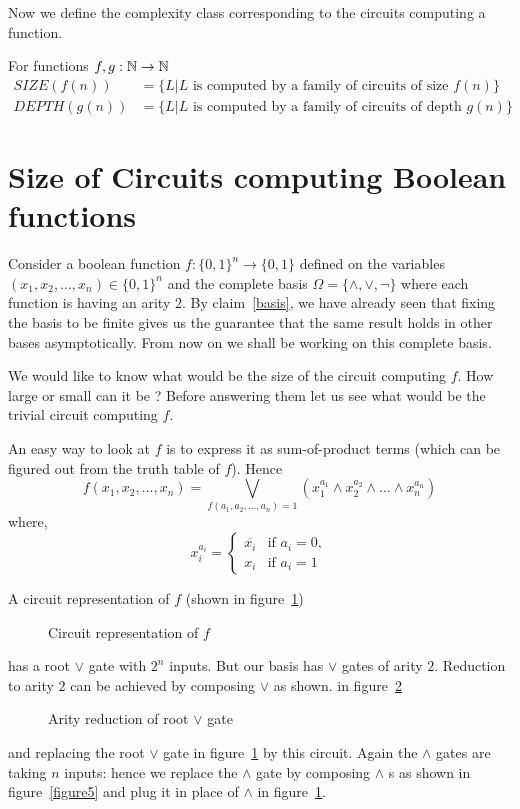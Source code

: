 Now we define the complexity class corresponding to the circuits computing a
function.
\begin{definition} For functions $f,g : {\mathbb{N}} \to {\mathbb{N}}$
\begin{align*}
SIZE(f(n)) & = \{ L | L \text{ is computed by a family of circuits of size }
f(n) \} \\
DEPTH(g(n)) & = \{ L | L \text{ is computed by a family of circuits of depth }
g(n) \} 
\end{align*}
\end{definition}

\section{Size of Circuits computing Boolean functions}
Consider a boolean function $f: \{0,1\}^n \to \{0,1\}$ defined on the
variables $(x_1,x_2,\ldots,x_n) \in \{0,1\}^n$ and the complete basis
$\Omega = \{\land,\lor,\neg\}$ where each function is having an arity $2$.
By claim~\ref{basis}, we have already seen that fixing the basis to be finite
gives us the guarantee that the same result holds in other bases
asymptotically. From now on we shall be working on this complete basis.

We would like to know what would be the size of the circuit computing $f$. How
large or small can it be ? Before answering them let us see what would be the
trivial circuit computing $f$.

An easy way to look at $f$ is to express it as sum-of-product terms (which can
be figured out from the truth table of $f$). Hence 
\[ f(x_1,x_2,\ldots,x_n) = \bigvee_{f(a_1,a_2,\ldots,a_n) = 1}(x_1^{a_1} \land
x_2^{a_2} \land \ldots \land x_n^{a_n} ) \]
where,
\[ x_i^{a_i} = \begin{cases}
		\overline{x_i} & \text{if } a_i = 0, \\
		x_i & \text{if } a_i = 1
		\end{cases} \]
\pagebreak

A circuit representation of $f$ (shown in figure~\ref{figure3})
\begin{figure}[htp!]
\centering

\caption{Circuit representation of $f$}
\label{figure3}
\end{figure}
has a root $\vee$ gate with $2^n$ inputs. But our basis has $\lor$ gates of 
arity $2$. Reduction to arity $2$ can be achieved by composing $\lor$ as shown.
in figure~\ref{figure4}
\begin{figure}[htp!]
\centering

\caption{Arity reduction of root $\lor$ gate}
\label{figure4}
\end{figure}
and replacing the root $\lor$ gate in figure~\ref{figure3} by this circuit. 
Again the $\land$ gates are taking $n$ inputs: hence we replace the $\land$ 
gate by composing $\land$ s as shown in figure~\ref{figure5} 
and plug it in place of $\land$ in figure~\ref{figure3}.

